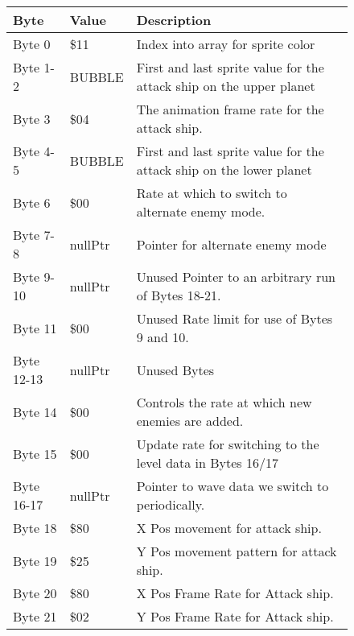 \begin{figure}[H]
{\begin{adjustbox}{width=12cm}
\begin{tabular}{lll}
\toprule
 Byte       & Value                     & Description                                                         \\
\midrule
 Byte 0     & \$11                       & Index into array for sprite color                                   \\
 Byte 1-2   & BUBBLE                    & First and last sprite value for the attack ship on the upper planet \\
 Byte 3     & \$04                       & The animation frame rate for the attack ship.                       \\
 Byte 4-5   & BUBBLE                    & First and last sprite value for the attack ship on the lower planet \\
 Byte 6     & \$00                       & Rate at which to switch to alternate enemy mode.                    \\
 Byte 7-8   & nullPtr                   & Pointer for alternate enemy mode                                    \\
 Byte 9-10  & nullPtr                   & Unused Pointer to an arbitrary run of Bytes 18-21.                  \\
 Byte 11    & \$00                       & Unused Rate limit for use of Bytes 9 and 10.                        \\
 Byte 12-13 & nullPtr                   & Unused Bytes                                                        \\
 Byte 14    & \$00                       & Controls the rate at which new enemies are added.                   \\
 Byte 15    & \$00                       & Update rate for switching to the level data in Bytes 16/17          \\
 Byte 16-17 & nullPtr                   & Pointer to wave data we switch to periodically.                     \\
 Byte 18    & \$80                       & X Pos movement for attack ship.                                     \\
 Byte 19    & \$25                       & Y Pos movement pattern for attack ship.                             \\
 Byte 20    & \$80                       & X Pos Frame Rate for Attack ship.                                   \\
 Byte 21    & \$02                       & Y Pos Frame Rate for Attack ship.                                   \\

\end{tabular}
\end{adjustbox}}
\end{figure}
